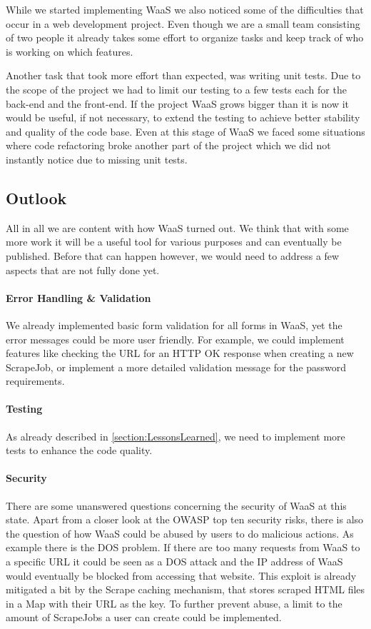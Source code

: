 \documentclass[titlepage, 12pt]{article}
\begin{document}
While we started implementing WaaS we also noticed some of the difficulties that occur in a web development project. Even though we are a small team consisting of two people it already takes some effort to organize tasks and keep track of who is working on which features.


Another task that took more effort than expected, was writing unit tests. Due to the scope of the project we had to limit our testing to a few tests each for the back-end and the front-end. If the project WaaS grows bigger than it is now it would be useful, if not necessary, to extend the testing to achieve better stability and quality of the code base. Even at this stage of WaaS we faced some situations where code refactoring broke another part of the project which we did not instantly notice due to missing unit tests.

\subsection{Outlook}

All in all we are content with how WaaS turned out. We think that with some more work it will be a useful tool for various purposes and can eventually be published. Before that can happen however, we would need to address a few aspects that are not fully done yet.

\paragraph{Error Handling \& Validation}
We already implemented basic form validation for all forms in WaaS, yet the error messages could  be more user friendly. For example, we could implement features like checking the URL for an HTTP OK response when creating a new ScrapeJob, or implement a more detailed validation message for the password requirements.
\paragraph{Testing}
As already described in \ref{section:LessonsLearned}, we need to implement more tests to enhance the code quality.
\paragraph{Security}
There are some unanswered questions concerning the security of WaaS at this state. Apart from a closer look at the OWASP top ten security risks, there is also the question of how WaaS could be abused by users to do malicious actions. As example there is the DOS problem. If there are too many requests from WaaS to a specific URL it could be seen as a DOS attack and the IP address of WaaS would eventually be blocked from accessing that website. This exploit is already mitigated a bit by the Scrape caching mechanism, that stores scraped HTML files in a Map with their URL as the key. To further prevent abuse, a limit to the amount of ScrapeJobs a user can create could be implemented.
\end{document}
